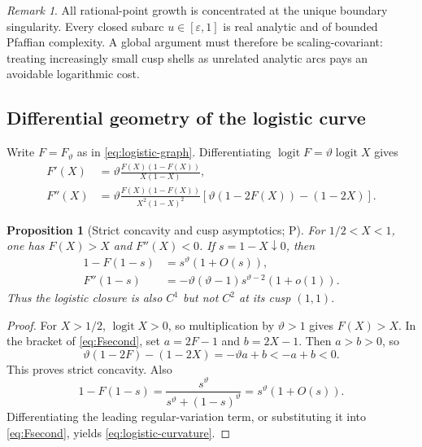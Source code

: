 \documentclass[10pt,oneside]{article}
\newtheorem{proposition}[theorem]{Proposition}
\theoremstyle{definition}
\theoremstyle{remark}
\newtheorem{remark}[theorem]{Remark}
\newcommand{\thetaq}{\vartheta}
\newcommand{\logit}{\operatorname{logit}}
\newcommand{\statusP}{\textsc{P}}
\begin{document}
\begin{remark}
All rational-point growth is concentrated at the unique boundary singularity.  Every closed subarc \(u\in[\varepsilon,1]\) is real analytic and of bounded Pfaffian complexity.  A global argument must therefore be scaling-covariant: treating increasingly small cusp shells as unrelated analytic arcs pays an avoidable logarithmic cost.
\end{remark}

\subsection{Differential geometry of the logistic curve}
Write \(F=F_{\thetaq}\) as in \eqref{eq:logistic-graph}.  Differentiating \(\logit F=\thetaq\logit X\) gives
\begin{align}
 F'(X)
 &=\thetaq\frac{F(X)(1-F(X))}{X(1-X)},\label{eq:Fprime}\\
 F''(X)
 &=\thetaq\frac{F(X)(1-F(X))}{X^2(1-X)^2}
 \left[\thetaq(1-2F(X))-(1-2X)\right].\label{eq:Fsecond}
\end{align}

\begin{proposition}[Strict concavity and cusp asymptotics; \statusP]
\label{prop:logistic-concavity}
For \(1/2<X<1\), one has \(F(X)>X\) and \(F''(X)<0\).  If \(s=1-X\downarrow0\), then
\begin{align}
 1-F(1-s)&=s^{\thetaq}(1+O(s)),\label{eq:logistic-cusp}\\
 F''(1-s)&=-\thetaq(\thetaq-1)s^{\thetaq-2}(1+o(1)).\label{eq:logistic-curvature}
\end{align}
Thus the logistic closure is also \(C^1\) but not \(C^2\) at its cusp \((1,1)\).
\end{proposition}

\begin{proof}
For \(X>1/2\), \(\logit X>0\), so multiplication by \(\thetaq>1\) gives \(F(X)>X\).  In the bracket of \eqref{eq:Fsecond}, set \(a=2F-1\) and \(b=2X-1\).  Then \(a>b>0\), so
\[
 \thetaq(1-2F)-(1-2X)=-\thetaq a+b<-a+b<0.
\]
This proves strict concavity.  Also
\[
 1-F(1-s)
 =\frac{s^{\thetaq}}{s^{\thetaq}+(1-s)^{\thetaq}}
 =s^{\thetaq}(1+O(s)).
\]
Differentiating the leading regular-variation term, or substituting it into \eqref{eq:Fsecond}, yields \eqref{eq:logistic-curvature}.
\end{proof}
\end{document}
